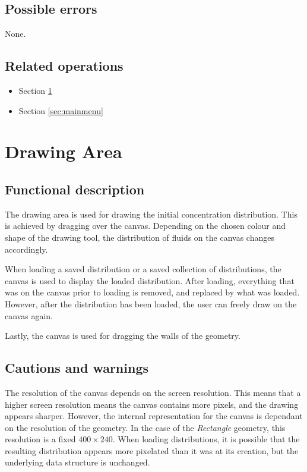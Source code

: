   \subsection*{Possible errors}
  None.

  \subsection*{Related operations}
  \begin{itemize}
    \item Section \ref{sec:drawingarea}
    \item Section \ref{sec:mainmenu}
  \end{itemize}

\section{Drawing Area}
\label{sec:drawingarea}
  \subsection*{Functional description}
  The drawing area is used for drawing the initial concentration distribution. This is achieved by dragging over the canvas. Depending on the chosen colour and shape of the drawing tool, the distribution of fluids on the canvas changes accordingly.
  
  When loading a saved distribution or a saved collection of distributions, the canvas is used to display the loaded distribution. After loading, everything that was on the canvas prior to loading is removed, and replaced by what was loaded. However, after the distribution has been loaded, the user can freely draw on the canvas again.
  
  Lastly, the canvas is used for dragging the walls of the geometry.
  
  \subsection*{Cautions and warnings}
  The resolution of the canvas depends on the screen resolution. This means that a higher screen resolution means the canvas contains more pixels, and the drawing appears sharper. However, the internal representation for the canvas is dependant on the resolution of the geometry. In the case of the \emph{Rectangle} geometry, this resolution is a fixed $400 \times 240$. When loading distributions, it is possible that the resulting distribution appears more pixelated than it was at its creation, but the underlying data structure is unchanged.
  

